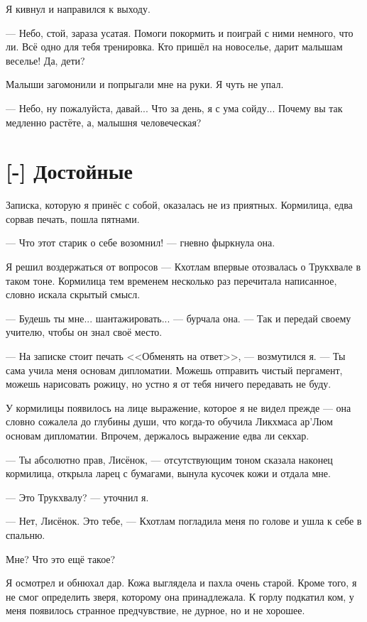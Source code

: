 Я кивнул и направился к выходу.

--- Небо, стой, зараза усатая.
Помоги покормить и поиграй с ними немного, что ли.
Всё одно для тебя тренировка.
Кто пришёл на новоселье, дарит малышам веселье!
Да, дети?

Малыши загомонили и попрыгали мне на руки.
Я чуть не упал.

--- Небо, ну пожалуйста, давай...
Что за день, я с ума сойду...
Почему вы так медленно растёте, а, малышня человеческая?

\section{[-] Достойные}

Записка, которую я принёс с собой, оказалась не из приятных.
Кормилица, едва сорвав печать, пошла пятнами.

--- Что этот старик о себе возомнил! --- гневно фыркнула она.

Я решил воздержаться от вопросов --- Кхотлам впервые отозвалась о Трукхвале в таком тоне.
Кормилица тем временем несколько раз перечитала написанное, словно искала скрытый смысл.

--- Будешь ты мне... шантажировать... --- бурчала она.
--- Так и передай своему учителю, чтобы он знал своё место.

--- На записке стоит печать <<Обменять на ответ>>, --- возмутился я.
--- Ты сама учила меня основам дипломатии.
Можешь отправить чистый пергамент, можешь нарисовать рожицу, но устно я от тебя ничего передавать не буду.

У кормилицы появилось на лице выражение, которое я не видел прежде --- она словно сожалела до глубины души, что когда-то обучила Ликхмаса ар'Люм основам дипломатии.
Впрочем, держалось выражение едва ли секхар.

--- Ты абсолютно прав, Лисёнок, --- отсутствующим тоном сказала наконец кормилица, открыла ларец с бумагами, вынула кусочек кожи и отдала мне.

--- Это Трукхвалу? --- уточнил я.

--- Нет, Лисёнок.
Это тебе, --- Кхотлам погладила меня по голове и ушла к себе в спальню.

Мне?
Что это ещё такое?

Я осмотрел и обнюхал дар.
Кожа выглядела и пахла очень старой.
Кроме того, я не смог определить зверя, которому она принадлежала.
К горлу подкатил ком, у меня появилось странное предчувствие, не дурное, но и не хорошее.


